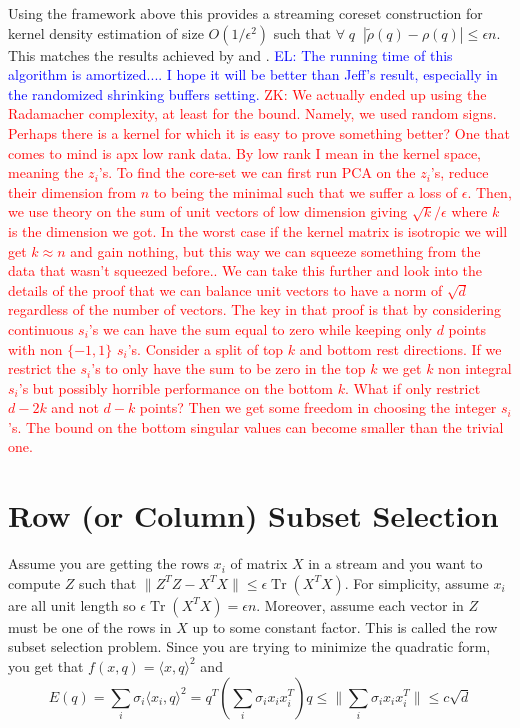\documentclass[anon,12pt]{colt2019} %
\newcommand{\zk}[1]{\textcolor{red}{ZK: #1}}
\newcommand{\el}[1]{\textcolor{blue}{EL: #1}}
\newcommand{\eps}{\epsilon}
\begin{document}
Using the framework above this provides a streaming coreset construction for kernel density estimation of size $O(1/\eps^2)$ such that 
$\forall \;q\;\; |\tilde \rho(q) - \rho(q)| \le \eps n$.
This matches the results achieved by \cite{DBLP:conf/soda/PhillipsT18} and \cite{DBLP:journals/corr/abs-1802-01751}.
\el{The running time of this algorithm is amortized.... I hope it will be better than Jeff's result, especially in the randomized shrinking buffers setting.}
\zk{We actually ended up using the Radamacher complexity, at least for the bound. Namely, we used random signs. Perhaps there is a kernel for which it is easy to prove something better? One that comes to mind is apx low rank data. By low rank I mean in the kernel space, meaning the $z_i$'s. To find the core-set we can first run PCA on the $z_i$'s, reduce their dimension from $n$ to being the minimal such that we suffer a loss of $\eps$. Then, we use theory on the sum of unit vectors of low dimension giving $\sqrt{k}/\eps$ where $k$ is the dimension we got. In the worst case if the kernel matrix is isotropic we will get $k \approx n$ and gain nothing, but this way we can squeeze something from the data that wasn't squeezed before.. We can take this further and look into the details of the proof that we can balance unit vectors to have a norm of $\sqrt{d}$ regardless of the number of vectors. The key in that proof is that by considering continuous $s_i$'s we can have the sum equal to zero while keeping only $d$ points with non $\{-1,1\}$ $s_i$'s. Consider a split of top $k$ and bottom rest directions. If we restrict the $s_i$'s to only have the sum to be zero in the top $k$ we get $k$ non integral $s_i$'s but possibly horrible performance on the bottom $k$. What if only restrict $d-2k$ and not $d-k$ points? Then we get some freedom in choosing the integer $s_i$'s. The bound on the bottom singular values can become smaller than the trivial one.}







\section{Row (or Column) Subset Selection}
Assume you are getting the rows $x_i$  of matrix $X$ in a stream and you want to compute $Z$ such that $\|Z^TZ - X^TX\| \le \eps \operatorname{Tr}(X^TX)$.
For simplicity, assume $x_i$ are all unit length so $\eps \operatorname{Tr}(X^TX) = \eps n$. Moreover, assume each vector in $Z$ must be one of the rows in $X$ up to some constant factor.
This is called the row subset selection problem. 
Since you are trying to minimize the quadratic form, you get that $f(x, q) = \langle x,q \rangle ^2$ and 
$$E(q) = \sum_i \sigma_i \langle x_i,q \rangle ^2 = q^T (\sum_i \sigma_i x_i x_i^T ) q \le \|\sum_i \sigma_i x_i x_i^T\| \le c\sqrt{d}$$
\end{document}
